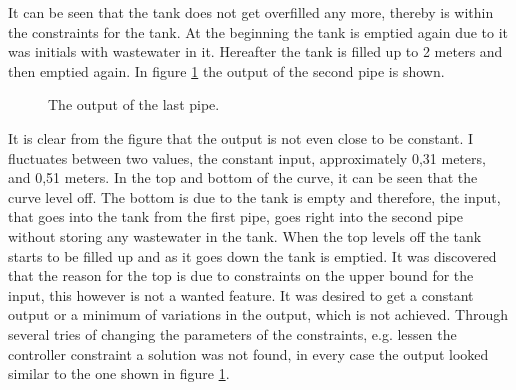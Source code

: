 It can be seen that the tank does not get overfilled any more, thereby is within the constraints for the tank. At the beginning the tank is emptied again due to it was initials with wastewater in it. Hereafter the tank is filled up to 2 meters and then emptied again. In figure \ref{fig:MPC_test_output_second_test_with_constraints} the output of the second pipe is shown. 

\begin{figure}[H]
 \centering
 
\caption{The output of the last pipe.}
\label{fig:MPC_test_output_second_test_with_constraints}
\end{figure}

It is clear from the figure that the output is not even close to be constant. I fluctuates between two values, the constant input, approximately 0,31 meters, and 0,51 meters. In the top and bottom of the curve, it can be seen that the curve level off. The bottom is due to the tank is empty and therefore, the input, that goes into the tank from the first pipe, goes right into the second pipe without storing any wastewater in the tank. When the top levels off the tank starts to be filled up and as it goes down the tank is emptied. It was discovered that the reason for the top is due to constraints on the upper bound for the input, this however is not a wanted feature. It was desired to get a constant output or a minimum of variations in the output, which is not achieved. Through several tries of changing the parameters of the constraints, e.g. lessen the controller constraint a solution was not found, in every case the output looked similar to the one shown in figure \ref{fig:MPC_test_output_second_test_with_constraints}.







